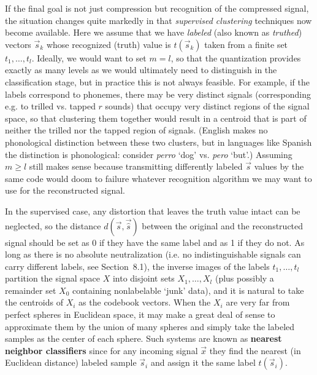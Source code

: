 If the final goal is not just compression but recognition of the compressed
signal, the situation changes quite markedly in that {\it supervised
  clustering} techniques now become available.
Here we assume that we have {\it labeled} (also known as {\it
  truthed\/}) vectors $\vec{s}_k$ whose recognized
(truth) value is $t(\vec{s}_k)$ taken from a finite set
$t_1,\ldots,t_l$. Ideally, we would want to set $m=l$, so that the
quantization provides exactly as many levels as we would ultimately need to
distinguish in the classification stage, but in practice this is not always
feasible. For example, if the labels correspond to phonemes, there may be very
distinct signals (corresponding e.g. to trilled vs. tapped $r$ sounds) that
occupy very distinct regions of the signal space, so that clustering them
together would result in a centroid that is part of neither the trilled nor
the tapped region of signals. (English makes no phonological distinction
between these two clusters, but in languages like Spanish the distinction is
phonological: consider {\it perro} `dog' vs. {\it pero} `but'.) Assuming $m\geq
l$ still makes sense because transmitting differently labeled $\vec{s}$
values by the same code would doom to failure whatever recognition algorithm
we may want to use for the reconstructed signal.

In the supervised case, any distortion that leaves the truth value intact can
be neglected, so the distance $d(\vec{s},\vec{\hat{s}})$ between the original
and the reconstructed signal should be set as 0 if they have the same label
and as 1 if they do not. As long as there is no absolute neutralization
(i.e. no indistinguishable signals can carry different labels, see
Section~8.1), the inverse images of the labels $t_1,\ldots,t_l$ partition the
signal space $X$ into disjoint sets $X_1,\ldots,X_l$ (plus possibly a
remainder set $X_0$ containing nonlabelable `junk' data), and it is natural to
take the centroids of $X_i$ as the codebook vectors. When the $X_i$ are very
far from perfect spheres in Euclidean space, it may make a great deal of sense
to approximate them by the union of many spheres and simply take the labeled
samples as the center of each sphere. Such systems are known as {\bf nearest
  neighbor classifiers} since for any
incoming signal $\vec{x}$ they find the nearest (in Euclidean distance)
labeled sample $\vec{s}_i$ and assign it the same label $t(\vec{s}_i)$.

